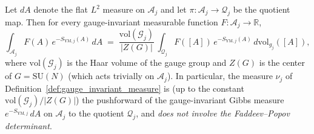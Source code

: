 \begin{lemma}
\label{lem:quotient_measure}
Let $dA$ denote the flat $L^{2}$ measure on $\mathcal{A}_{j}$
and let $\pi:\mathcal{A}_{j}\to\mathcal{Q}_{j}$ be the quotient
map. Then for every gauge-invariant measurable function
$F:\mathcal{A}_{j}\to\mathbb{R}$,
\begin{equation}
\label{eq:pushforward_identity}
  \int_{\mathcal{A}_{j}}F(A)\,e^{-S_{\mathrm{YM},j}(A)}\,dA
  \;=\;\frac{\mathrm{vol}(\mathcal{G}_{j})}{|Z(G)|}\,
  \int_{\mathcal{Q}_{j}}F([A])\,e^{-S_{\mathrm{YM},j}(A)}\,
  d\mathrm{vol}_{g_{j}}([A]),
\end{equation}
where $\mathrm{vol}(\mathcal{G}_{j})$ is the Haar volume of the
gauge group and $Z(G)$ is the center of $G=\mathrm{SU}(N)$
(which acts trivially on $\mathcal{A}_{j}$). In particular, the
measure $\nu_{j}$ of Definition~\ref{def:gauge_invariant_measure}
is (up to the constant $\mathrm{vol}(\mathcal{G}_{j})/|Z(G)|$)
the pushforward of the gauge-invariant Gibbs measure
$e^{-S_{\mathrm{YM},j}}\,dA$ on $\mathcal{A}_{j}$ to the quotient
$\mathcal{Q}_{j}$, and \emph{does not involve the
Faddeev--Popov determinant}.
\end{lemma}

